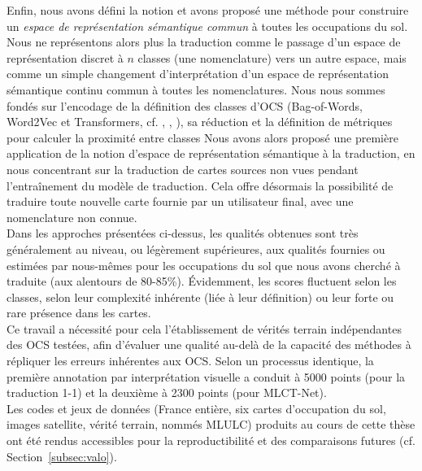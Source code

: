 Enfin, nous avons défini la notion et avons proposé une méthode pour construire un \emph{espace de représentation sémantique commun} à toutes les occupations du sol. Nous ne représentons alors plus la traduction comme le passage d'un espace de représentation discret à $n$ classes (une nomenclature) vers un autre espace, mais comme un simple changement d'interprétation d'un espace de représentation sémantique continu commun à toutes les nomenclatures. Nous nous sommes fondés sur l'encodage de la définition des classes d'OCS (Bag-of-Words, Word2Vec et Transformers, cf. \cite{Comber2015}, \cite{Pradhan2020}, \cite{Wang2020}), sa réduction et la définition de métriques pour calculer la proximité entre classes Nous avons alors proposé une première application de la notion d'espace de représentation sémantique à la traduction, en nous concentrant sur la traduction de cartes sources non vues pendant l’entraînement du modèle de traduction. Cela offre désormais la possibilité de traduire toute nouvelle carte fournie par un utilisateur final, avec une nomenclature non connue.\\

Dans les approches présentées ci-dessus, les qualités obtenues sont très généralement au niveau, ou légèrement supérieures, aux qualités fournies ou estimées par nous-mêmes pour les occupations du sol que nous avons cherché à traduite (aux alentours de 80-85\%). \'Evidemment, les scores fluctuent selon les classes, selon leur complexité inhérente (liée à leur définition) ou leur forte ou rare présence dans les cartes.\\
Ce travail a nécessité pour cela l'établissement de vérités terrain indépendantes des OCS testées, afin d'évaluer une qualité au-delà de la capacité des méthodes à répliquer les erreurs inhérentes aux OCS. Selon un processus identique, la première annotation par interprétation visuelle a conduit à 5000 points (pour la traduction 1-1) et la deuxième à 2300 points (pour MLCT-Net).\\

Les codes et jeux de données (France entière, six cartes d'occupation du sol, images satellite, vérité terrain, nommés MLULC) produits au cours de cette thèse ont été rendus accessibles pour la reproductibilité et des comparaisons futures (cf. Section~\ref{subsec:valo}).


